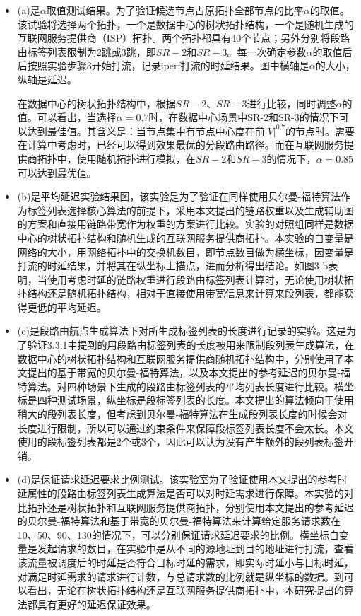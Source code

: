 \begin{itemize}
\item (a)是$\alpha$取值测试结果。为了验证候选节点占原拓扑全部节点的比率$\alpha$的取值。该试验将选择两个拓扑，一个是数据中心的树状拓扑结构，一个是随机生成的互联网服务提供商（ISP）拓扑。两个拓扑都具有40个节点；另外分别将段路由标签列表限制为2跳或3跳，即$SR-2$和$SR-3$。每一次确定参数$\alpha$的取值后后按照实验步骤3开始打流，记录iperf打流的时延结果。图中横轴是$\alpha$的大小，纵轴是延迟。

在数据中心的树状拓扑结构中，根据$SR-2$、$SR-3$进行比较，同时调整$\alpha$的值。可以看出，当选择$\alpha=0.7$时，在数据中心场景中SR-2和SR-3的情况下可以达到最佳值。其含义是：当节点集中有节点中心度在前${|V|}^{0.7}$的节点时。需要在计算中考虑时，已经可以得到效果最优的分段路由路径。而在互联网服务提供商拓扑中，使用随机拓扑进行模拟，在$SR-2$和$SR-3$的情况下，$\alpha=0.85$可以达到最优值。

\item (b)是平均延迟实验结果图，该实验是为了验证在同样使用贝尔曼-福特算法作为标签列表选择核心算法的前提下，采用本文提出的链路权重以及生成辅助图的方案和直接用链路带宽作为权重的方案进行比较。实验的对照组同样是数据中心的树状拓扑结构和随机生成的互联网服务提供商拓扑。本实验的自变量是网络的大小，用网络拓扑中的交换机数目，即节点数目做为横坐标，因变量是打流的时延结果，并将其在纵坐标上描点，进而分析得出结论。如图3-b表明，当使用考虑时延的链路权重进行段路由标签列表计算时，无论使用树状拓扑结构还是随机拓扑结构，相对于直接使用带宽信息来计算来段列表，都能获得更低的平均延迟。
\item (c)是段路由航点生成算法下对所生成标签列表的长度进行记录的实验。这是为了验证3.3.1中提到的用段路由标签列表的长度被用来限制段列表生成算法，在数据中心的树状拓扑结构和互联网服务提供商随机拓扑结构中，分别使用了本文提出的基于带宽的贝尔曼-福特算法，以及本文提出的参考延迟的贝尔曼-福特算法。对四种场景下生成的段路由标签列表的平均列表长度进行比较。横坐标是四种测试场景，纵坐标是段标签列表的长度。本文提出的算法倾向于使用稍大的段列表长度，但考虑到贝尔曼-福特算法在生成段列表长度的时候会对长度进行限制，所以可以通过约束条件来保障段标签列表长度不会太长。本文使用的段标签列表都是2个或3个，因此可以认为没有产生额外的段列表标签开销。
\item (d)是保证请求延迟要求比例测试。该实验室为了验证使用本文提出的参考时延属性的段路由标签列表生成算法是否可以对时延需求进行保障。本实验的对比拓扑还是树状拓扑和互联网服务提供商拓扑，分别使用本文提出的参考延迟的贝尔曼-福特算法和基于带宽的贝尔曼-福特算法来计算给定服务请求数在10、50、90、130的情况下，可以分别保证请求延迟要求的比例。横坐标自变量是发起请求的数目，在实验中是从不同的源地址到目的地址进行打流，查看该流量被调度后的时延是否符合目标时延的需求，即实际时延小与目标时延，对满足时延需求的请求进行计数，与总请求数的比例就是纵坐标的数据。到可以看出，无论在树状拓扑结构还是互联网服务提供商拓扑中，本研究提出的算法都具有更好的延迟保证效果。
\end{itemize}


